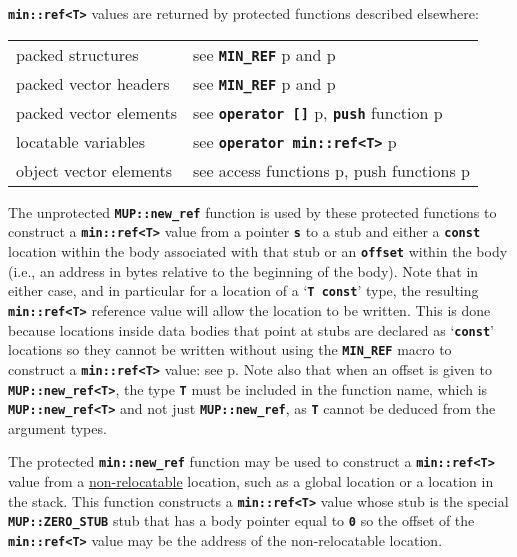 \documentclass[12pt]{article}
\newcommand{\TT}[1]{{\tt \bfseries #1}}
\newcommand{\pagref}[1]{p\pageref{#1}}
\newcommand{\EOL}{\penalty \exhyphenpenalty}
\begin{document}
\TT{min::ref<T>} values are returned by protected functions described
elsewhere:
\begin{center}
\begin{tabular}{ll}
packed structures & see \TT{MIN\_REF}
    \pagref{MIN_REF} and \pagref{PACKED_STRUCT_MIN_REF} \\
packed vector headers & see \TT{MIN\_REF}
    \pagref{MIN_REF} and \pagref{PACKED_VEC_MIN_REF} \\
packed vector elements	& see \TT{operator []}
    \pagref{MIN::PACKED_VEC_PTR_[]},
    \TT{push} function \pagref{MIN::PACKED_VEC_PUSH} \\
locatable variables	& see \TT{operator min::ref<T>}
    \pagref{LOCATABLE_VAR_REF} \\
object vector elements	& see access functions \pagref{OBJ_VEC_UPDPTR_REF},
			  push functions \pagref{OBJ_VEC_UPDPTR_PUSH_REF}
\end{tabular}
\end{center}

The unprotected \TT{MUP::new\_ref} function is used by these
protected functions to construct a \TT{min::\EOL ref<T>} value
from a pointer \TT{s} to a stub and either a \TT{const} location
within the body associated with that stub or an \TT{offset}
within the body
(i.e., an address in bytes relative to the beginning of the body).
Note that in either case, and in particular for a location
of a `\TT{T const}' type, the resulting
\TT{min::\EOL ref<T>} reference value will allow the location
to be written.  This is done because locations inside data bodies
that point at stubs are declared as `\TT{const}' locations
so they cannot be written without using
the \TT{MIN\_\EOL REF} macro to construct a
\TT{min::\EOL ref<T>} value: see \pagref{MIN_REF_USAGE}.
Note also that when an offset is given to
\TT{MUP::\EOL new\_\EOL ref<T>}, the type \TT{T}
must be included in the function name,
which is \TT{MUP::\EOL new\_\EOL ref<T>}
and not just \TT{MUP::\EOL new\_\EOL ref}, as \TT{T} cannot
be deduced from the argument types.

The protected \TT{min::new\_ref} function\label{NEW_REF_USAGE}
may be used to construct
a \TT{min::\EOL ref<T>} value from a \underline{non-relocatable} location,
such as a global location or a location in the stack.
This function constructs a \TT{min::\EOL ref<T>} value whose
stub is the special \TT{MUP::\EOL ZERO\_\EOL STUB} stub that
has a body pointer equal to \TT{0} so the offset of the
\TT{min::\EOL ref<T>} value may be the address of the
non-relocatable location.
\end{document}
